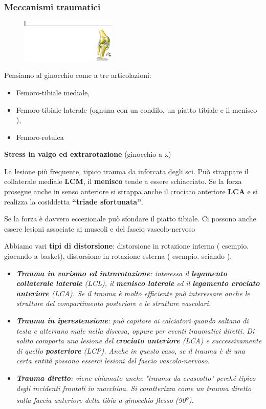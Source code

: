 \subsubsection{Meccanismi traumatici }

\begin{figure}[!ht]
\centering
\includegraphics[width=0.4\textwidth]{009/image12.png}
\end{figure}

Pensiamo al ginocchio come a tre articolazioni:
\begin{itemize}
\item Femoro-tibiale mediale,
\item Femoro-tibiale laterale (ognuna con un condilo, un piatto tibiale e il menisco ),
\item Femoro-rotulea
\end{itemize}

\textbf{Stress in valgo ed extrarotazione} (ginocchio a x)

La lesione più frequente, tipico trauma da inforcata degli sci. Può strappare il collaterale mediale \textbf{LCM}, il \textbf{menisco} tende a essere schiacciato. Se la forza prosegue anche in senso anteriore si strappa anche il crociato anteriore \textbf{LCA} e si realizza la cosiddetta \textbf{``triade sfortunata''}.

Se la forza è davvero eccezionale può sfondare il piatto tibiale. Ci possono anche essere lesioni associate ai muscoli e del fascio vascolo-nervoso

Abbiamo vari \textbf{tipi di distorsione}: distorsione in rotazione interna ( esempio. giocando a basket), distorsione in rotazione esterna ( esempio. sciando ).

\begin{itemize}
\item
  \emph{\textbf{Trauma in varismo ed intrarotazione}: interessa il \textbf{legamento collaterale laterale} (LCL), il \textbf{menisco laterale} ed il \textbf{legamento crociato anteriore} (LCA). Se il trauma è molto efficiente può interessare anche le strutture del compartimento posteriore e le strutture vascolari. }
\item
  \emph{\textbf{Trauma in iperestensione}: può capitare ai calciatori quando saltano di testa e atterrano male nella discesa, oppure per eventi traumatici diretti. Di solito comporta una lesione del \textbf{crociato anteriore} (LCA) e successivamente di quello \textbf{posteriore} (LCP). Anche in questo caso, se il trauma è di una certa entità possono esserci lesioni del fascio vascolo-nervoso. }
\item
  \emph{\textbf{Trauma diretto}: viene chiamato anche "trauma da cruscotto" perché tipico degli incidenti frontali in macchina. Si caratterizza come un trauma diretto sulla faccia anteriore della tibia a ginocchio flesso (90\textsuperscript{o}). }
\end{itemize}


